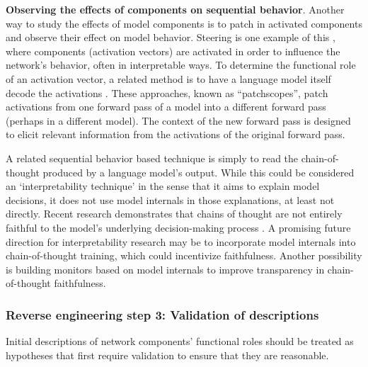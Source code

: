 \textbf{Observing the effects of components on sequential behavior}. Another way to study the effects of model components is to patch in activated components and observe their effect on model behavior. Steering is one example of this \citep{panickssery2024steeringllama2contrastive,turner2024steeringlanguagemodelsactivation}, where components (activation vectors) are activated in order to influence the network's behavior, often in interpretable ways. To determine the functional role of an activation vector, a related method is to have a language model itself decode the activations \citep{chen2024selfieselfinterpretationlargelanguage, Mwatkins_2023, ghandeharioun2024patchscopesunifyingframeworkinspecting, huang2024inversionviewgeneralpurposemethodreading, kharlapenko2024self}. These approaches, known as “patchscopes”, patch activations from one forward pass of a model into a different forward pass (perhaps in a different model). The context of the new forward pass is designed to elicit relevant information from the activations of the original forward pass.

A related sequential behavior based technique is simply to read the chain-of-thought \citep{wei2023chainofthoughtpromptingelicitsreasoning, kojima2023largelanguagemodelszeroshot} produced by a language model's output. While this could be considered an `interpretability technique' in the sense that it aims to explain model decisions, it does not use model internals in those explanations, at least not directly. Recent research demonstrates that chains of thought are not entirely faithful to the model's underlying decision-making process \citep{agarwal2024faithfulnessvsplausibilityunreliability, atanasova2023faithfulnesstestsnaturallanguage, Turpin2023_cot, lanham2023measuringfaithfulnesschainofthoughtreasoning, Ye_2022_unreliability}. A promising future direction for interpretability research may be to incorporate model internals into chain-of-thought training, which could incentivize faithfulness. Another possibility is building monitors based on model internals to improve transparency in chain-of-thought faithfulness.

\subsubsection{Reverse engineering step 3: Validation of descriptions}
\label{subsec:reverse-engineering-step-3}

Initial descriptions of network components' functional roles should be treated as hypotheses that first require validation to ensure that they are reasonable.

